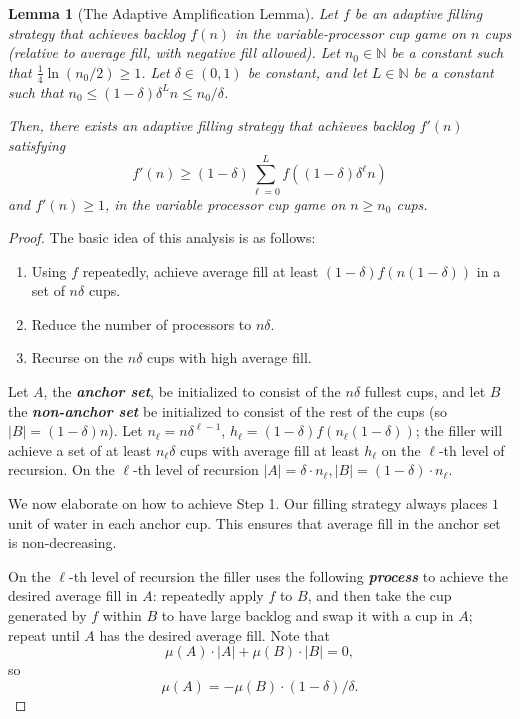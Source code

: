 \documentclass[twocolumn]{article}[11pt]
\newcommand{\defn}[1]{{\textit{\textbf{\boldmath #1}}}}
\newtheorem{lemma}{Lemma}
\begin{document}
\begin{lemma}[The Adaptive Amplification Lemma]\label{lem:adaptiveAmplification}
  Let $f$ be an adaptive filling strategy that achieves backlog $f(n)$ in the
  variable-processor cup game on $n$ cups (relative to average fill, with
  negative fill allowed).
  Let $n_0 \in \mathbb{N}$ be a constant such that $\frac{1}{4} \ln (n_0/2) \ge
  1$. Let $\delta\in(0,1)$ be constant, and let $L\in\mathbb{N}$ be a constant
  such that $n_0 \le (1-\delta)\delta^L n \le n_0/\delta$.

  Then, there exists an adaptive filling strategy that achieves backlog $f'(n)$ satisfying
  $$f'(n) \ge (1-\delta)\sum_{\ell= 0}^{L} f((1-\delta)\delta^\ell n)$$
  and $f'(n) \ge 1$, in the variable processor cup game on $n\ge n_0$ cups.
\end{lemma}
\begin{proof}
  The basic idea of this analysis is as follows:
  \begin{enumerate}
    \item Using $f$ repeatedly, achieve average fill at least $(1-\delta)
      f(n(1-\delta))$ in a set of $n\delta$ cups. 
    \item Reduce the number of processors to $n\delta$.
    \item Recurse on the $n\delta$ cups with high average fill.
  \end{enumerate}

  Let $A$, the \defn{anchor set}, be initialized to consist of the $n\delta$
  fullest cups, and let $B$ the \defn{non-anchor set} be initialized to consist
  of the rest of the cups (so $|B| = (1-\delta)n$).
  Let $n_\ell = n\delta^{\ell-1}$, $h_\ell = (1-\delta)f(n_\ell(1-\delta))$;
  the filler will achieve a set of at least $n_\ell \delta$ cups with average
  fill at least $h_\ell$ on the $\ell$-th
  level of recursion. On the $\ell$-th level of recursion $|A| = \delta\cdot
  n_\ell, |B| = (1-\delta)\cdot n_\ell$.

  We now elaborate on how to achieve Step 1.
  Our filling strategy always places $1$ unit of water in each anchor cup. This
  ensures that average fill in the anchor set is non-decreasing.

  On the $\ell$-th level of recursion the filler uses the following
  \defn{process} to achieve the desired average fill in $A$: repeatedly apply $f$ to
  $B$, and then take the cup generated by $f$ within $B$ to have large backlog
  and swap it with a cup in $A$; repeat until $A$ has the desired average fill.
  Note that $$\mu(A) \cdot |A| +\mu(B)\cdot |B| = 0,$$
  so
  $$\mu(A) = - \mu(B) \cdot (1-\delta)/ \delta.$$


\end{proof}
\end{document}
